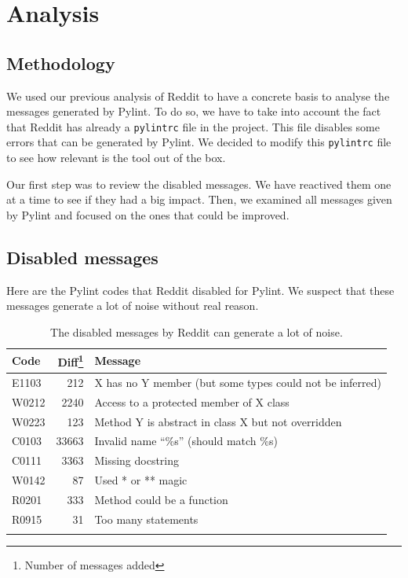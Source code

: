 \documentclass[11pt, a4paper]{article}
\newcommand{\pyl}{\textsf{Pylint}}
\begin{document}
\section*{Analysis}
\subsection*{Methodology}

We used our previous analysis of Reddit to have a concrete basis to analyse the messages generated by \pyl{}.
To do so, we have to take into account the fact that Reddit has already a \texttt{pylintrc} file in the project.
This file disables some errors that can be generated by \pyl{}.
We decided to modify this \texttt{pylintrc} file to see how relevant is the tool out of the box.


\medskip
Our first step was to review the disabled messages.
We have reactived them one at a time to see if they had a big impact.
Then, we examined all messages given by \pyl{} and focused on the ones that could be improved.

\subsection*{Disabled messages}
Here are the \pyl{} codes that Reddit disabled for \pyl{}. 
We suspect that these messages generate a lot of noise without real reason. \\

\begin{longtable}{|l|r|m{9cm}|}
\hline
\textbf{\small{Code}} & \textbf{\small{Diff\footnote{Number of messages added}}} & \textbf{\small{Message}} \\
\hline
\hline
E1103 & 212 & X has no Y member (but some types could not be inferred) \\
\hline
W0212 & 2240  & Access to a protected member of X class \\
\hline
W0223 & 123 & Method Y is abstract in class X but not overridden \\
\hline
C0103 & 33663 & Invalid name ``\%s'' (should match \%s) \\
\hline
C0111 & 3363 & Missing docstring \\
\hline
W0142 & 87 & Used * or ** magic \\
\hline
R0201 & 333 & Method could be a function \\
\hline
R0915 & 31 & Too many statements \\
\hline
\caption{\label{messages} The disabled messages by Reddit can generate a lot of noise. }
\end{longtable}
\end{document}
